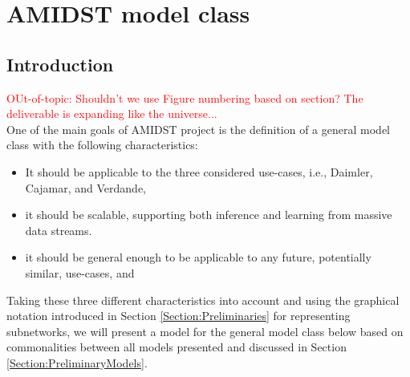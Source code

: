 \section{AMIDST model class}

\subsection{Introduction}

\textcolor{red}{OUt-of-topic: Shouldn't we use Figure numbering based on section? The deliverable is expanding like the universe...}\\
One of the main goals of AMIDST project is the definition of a general model class with the following characteristics: 

\begin{itemize}
\item It should be applicable to the three considered use-cases, i.e., Daimler, Cajamar, and Verdande,

\item it should be scalable, supporting both inference and learning from massive data streams.

\item it should be general enough to be applicable to any future, potentially similar, use-cases, and


 
\end{itemize}

Taking these three different characteristics into account and using the graphical notation introduced in Section \ref{Section:Preliminaries} for representing subnetworks, we will present a model for the general model class below based on commonalities between all models presented and discussed in Section \ref{Section:PreliminaryModels}. 



